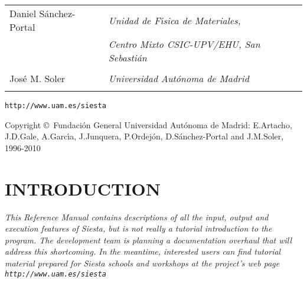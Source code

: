 \documentclass[11pt]{article}
\begin{document}
\begin{titlepage}
\begin{center}
{\begin{tabular}{ll}
{\Large Daniel S\'anchez-Portal} &
   \Large{\it Unidad de F\'{\i}sica de Materiales,} \\
                                 &
   \Large{\it Centro Mixto CSIC-UPV/EHU, San Sebasti\'an} \\ \\

{\Large Jos\'e M. Soler} &
   \Large{\it Universidad Aut\'onoma de Madrid} \\ \\

\end{tabular}
}

\vspace{0.5cm}
{\Large {\tt http://www.uam.es/siesta} }

\vspace{0.5cm}
Copyright \copyright\  Fundaci\'on General Universidad Aut\'onoma de Madrid:
E.Artacho, J.D.Gale, A.Garc\'{\i}a, J.Junquera, P.Ordej\'on,
D.S\'anchez-Portal and J.M.Soler, 1996-2010

\end{center}

\end{titlepage}


\newpage

\tableofcontents

\newpage

\section{INTRODUCTION}

{\it This Reference Manual contains descriptions of all the input,
  output and execution features of {\sc Siesta}, but is not really a
  tutorial introduction to the program. The development team is
  planning a documentation overhaul that will address this
  shortcoming. In the meantime, interested users can find tutorial
  material prepared for {\sc Siesta} schools and workshops at the
  project's web page {\tt http://www.uam.es/siesta}}
\end{document}
